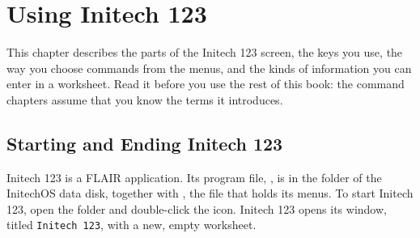 \chapter{Using Initech 123}

This chapter describes the parts of the Initech 123 screen, the keys you
use, the way you choose commands from the menus, and the kinds of
information you can enter in a worksheet.  Read it before you use the rest
of this book: the command chapters assume that you know the terms it
introduces.

\section{Starting and Ending Initech 123}
Initech 123 is a FLAIR application.  Its program file, , is
in the folder  of the InitechOS data disk, together with
, the file that holds its menus.  To start Initech 123, open
the  folder and double-click the  icon.  Initech
123 opens its window, titled \texttt{Initech 123}, with a new, empty
worksheet.


